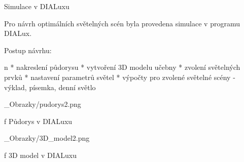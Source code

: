 \chap Simulace v DIALuxu

Pro návrh optimálních světelných scén byla provedena simulace v programu DIALux.

\medskip
Postup návrhu:

\begitems \style n
* nakreslení půdorysu
* vytvoření 3D modelu učebny
* zvolení světelných prvků
* nastavení parametrů světel
* výpočty pro zvolené světelné scény - výklad, písemka, denní světlo
\enditems
\medskip

\medskip {}
\picw=8cm _Obrazky/pudorys2.png
\caption/f Půdorys v DIALuxu
\medskip

\medskip {}
\picw=8cm _Obrazky/3D_model2.png
\caption/f 3D model v DIALuxu
\medskip
